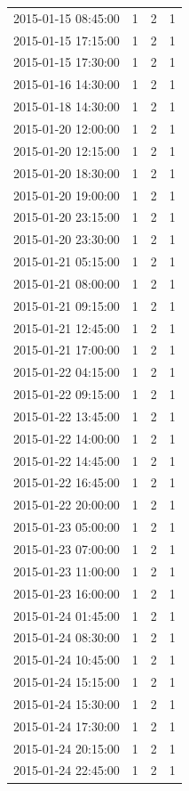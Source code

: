 \begin{tabular}{lrrr}
2015-01-15 08:45:00 & 1 & 2 & 1 \\
2015-01-15 17:15:00 & 1 & 2 & 1 \\
2015-01-15 17:30:00 & 1 & 2 & 1 \\
2015-01-16 14:30:00 & 1 & 2 & 1 \\
2015-01-18 14:30:00 & 1 & 2 & 1 \\
2015-01-20 12:00:00 & 1 & 2 & 1 \\
2015-01-20 12:15:00 & 1 & 2 & 1 \\
2015-01-20 18:30:00 & 1 & 2 & 1 \\
2015-01-20 19:00:00 & 1 & 2 & 1 \\
2015-01-20 23:15:00 & 1 & 2 & 1 \\
2015-01-20 23:30:00 & 1 & 2 & 1 \\
2015-01-21 05:15:00 & 1 & 2 & 1 \\
2015-01-21 08:00:00 & 1 & 2 & 1 \\
2015-01-21 09:15:00 & 1 & 2 & 1 \\
2015-01-21 12:45:00 & 1 & 2 & 1 \\
2015-01-21 17:00:00 & 1 & 2 & 1 \\
2015-01-22 04:15:00 & 1 & 2 & 1 \\
2015-01-22 09:15:00 & 1 & 2 & 1 \\
2015-01-22 13:45:00 & 1 & 2 & 1 \\
2015-01-22 14:00:00 & 1 & 2 & 1 \\
2015-01-22 14:45:00 & 1 & 2 & 1 \\
2015-01-22 16:45:00 & 1 & 2 & 1 \\
2015-01-22 20:00:00 & 1 & 2 & 1 \\
2015-01-23 05:00:00 & 1 & 2 & 1 \\
2015-01-23 07:00:00 & 1 & 2 & 1 \\
2015-01-23 11:00:00 & 1 & 2 & 1 \\
2015-01-23 16:00:00 & 1 & 2 & 1 \\
2015-01-24 01:45:00 & 1 & 2 & 1 \\
2015-01-24 08:30:00 & 1 & 2 & 1 \\
2015-01-24 10:45:00 & 1 & 2 & 1 \\
2015-01-24 15:15:00 & 1 & 2 & 1 \\
2015-01-24 15:30:00 & 1 & 2 & 1 \\
2015-01-24 17:30:00 & 1 & 2 & 1 \\
2015-01-24 20:15:00 & 1 & 2 & 1 \\
2015-01-24 22:45:00 & 1 & 2 & 1 \\

\end{tabular}
